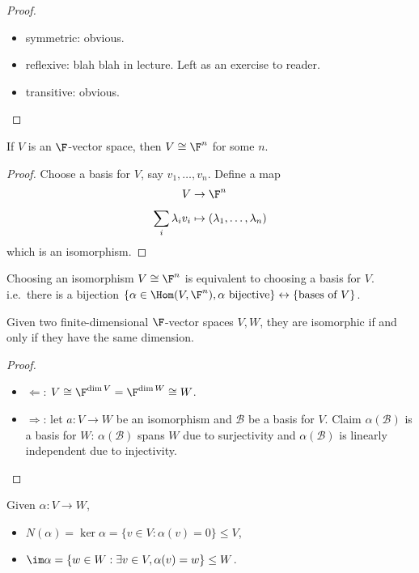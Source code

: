 \documentclass[a4paper]{article}
\newcommand*{\basis}{\mathcal}
\theoremstyle{definition}
\begin{document}
\begin{proof}\leavevmode
  \begin{itemize}
  \item symmetric: obvious.
  \item reflexive: blah blah in lecture. Left as an exercise to reader.
  \item transitive: obvious.
  \end{itemize}
\end{proof}

\begin{theorem}
  If \(V\) is an \(\F\)-vector space, then \(V \cong \F^n\) for some \(n\).
\end{theorem}

\begin{proof}
  Choose a basis for \(V\), say \(v_1,\ldots, v_n\). Define a map
  \begin{align*}
    V &\to \F^n \\
    \sum_{i}^{ }\lambda_iv_i &\mapsto (\lambda_1,\ldots,\lambda_n)
  \end{align*}
which is an isomorphism.
\end{proof}

\begin{remark}
  Choosing an isomorphism \(V \cong \F^n\) is equivalent to choosing a basis for \(V\). i.e.\ there is a bijection \(\{\alpha\in\Hom(V,\F^n), \alpha\text{ bijective}\} \leftrightarrow \{\text{bases of } V\} \).
\end{remark}

\begin{theorem}
  Given two finite-dimensional \(\F\)-vector spaces \(V, W\), they are isomorphic if and only if they have the same dimension.
\end{theorem}

\begin{proof}\leavevmode
  \begin{itemize}
  \item \(\Leftarrow\): \(V \cong \F^{\dim V} = \F^{\dim W} \cong W\).
  \item \(\Rightarrow\): let \(a:V\to W\) be an isomorphism and \(\basis B\) be a basis for \(V\). Claim \(\alpha(\basis B)\) is a basis for \(W\): \(\alpha(\basis B)\) spans \(W\) due to surjectivity and \(\alpha(\basis B)\) is linearly independent due to injectivity.
  \end{itemize}
\end{proof}

\begin{definition}
  Given \(\alpha: V\to W\),
  \begin{itemize}
  \item \(N(\alpha) = \ker \alpha = \{v\in V: \alpha(v) = 0\} \leq V\),
  \item \(\im \alpha = \{w\in W: \exists v\in V, \alpha(v) = w \} \leq W\).
  \end{itemize}
\end{definition}
\end{document}
